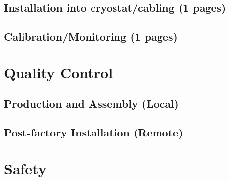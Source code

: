 \subsection{Installation into cryostat/cabling  (1 pages)}
\label{sec:fdsp-pd-install-pd-cryo}

\subsection{Calibration/Monitoring  (1 pages)}
\label{sec:fdsp-pd-install-calib}


\section{Quality Control}
\label{sec:fdsp-pd-qc}


\subsection{Production and Assembly (Local)}
\label{sec:fdsp-pd-qc-local}


\subsection{Post-factory Installation (Remote)}
\label{sec:fdsp-pd-qc-remote}


\section{Safety}
\label{sec:fdsp-pd-safety}




